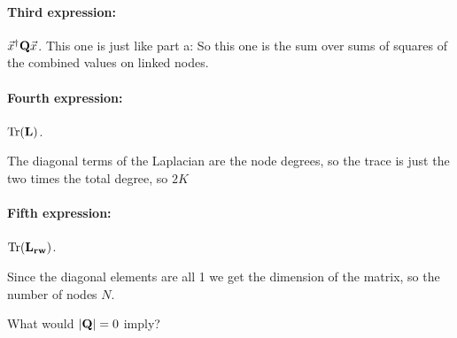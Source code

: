 \paragraph{Third expression:} $\vec{x}^\dag {\bf Q} \vec{x}$.  
This one is just like part a:
So this one is the sum over sums of squares of the combined values on linked nodes. 

\paragraph{Fourth expression:} $\rm Tr(\bf L)$. 

The diagonal terms of the Laplacian are the node degrees, so the trace is just the two times the total degree, so $2K$

\paragraph{Fifth expression:} $\rm Tr(\bf L_{rw})$.

Since the diagonal elements are all 1 we get the dimension of the matrix, so the number of nodes $N$. 

\subquestion
What would $|{\bf Q}|=0$ imply?

